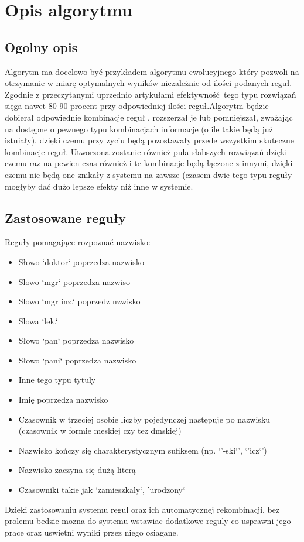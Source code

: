 \documentclass[12pt]{article}
\begin{document}
\section{Opis algorytmu}
\subsection{Ogolny opis}
Algorytm ma docelowo być przykładem algorytmu ewolucyjnego który pozwoli na otrzymanie w miarę optymalnych wyników niezależnie od ilości podanych reguł. Zgodnie z przeczytanymi uprzednio artykułami efektywność tego typu rozwiązań sięga nawet 80-90 procent przy odpowiedniej ilości reguł.Algorytm będzie dobierał odpowiednie kombinacje reguł , rozszerzał je lub pomniejszał, zważając na dostępne o pewnego typu kombinacjach informacje (o ile takie będą już istniały), dzięki czemu przy zyciu będą pozostawały przede wszystkim skuteczne kombinacje reguł. Utworzona zostanie również pula słabszych rozwiązań dzięki czemu raz na pewien czas również i te kombinacje będą łączone z innymi, dzięki czemu nie będą one znikały z systemu na zawsze (czasem dwie tego typu reguły mogłyby dać dużo lepsze efekty niż inne w systemie.
\subsection{Zastosowane reguły}
Reguły pomagające rozpoznać nazwisko:
\begin{itemize}
\item Słowo `doktor` poprzedza nazwisko
\item Slowo `mgr` poprzedza nazwiso
\item Slowo `mgr inz.` poprzedz nzwisko
\item Slowa `lek.`
\item Słowo `pan` poprzedza nazwisko
\item Słowo `pani` poprzedza nazwisko
\item Inne tego typu tytuly
\item Imię poprzedza nazwisko
\item Czasownik w trzeciej osobie liczby pojedynczej następuje po nazwisku (czasownik w formie meskiej czy tez dmskiej)
\item Nazwisko kończy się charakterystycznym sufiksem (np. `'-ski`', `'icz`')
\item Nazwisko zaczyna się dużą literą
\item Czasowniki takie jak `zamieszkaly`, 'urodzony`
\end{itemize}
Dzieki zastosowaniu systemu regul oraz ich automatycznej rekombinacji, bez prolemu bedzie mozna do systemu wstawiac dodatkowe reguly co usprawni jego prace oraz uswietni wyniki przez niego osiagane.
\end{document}
